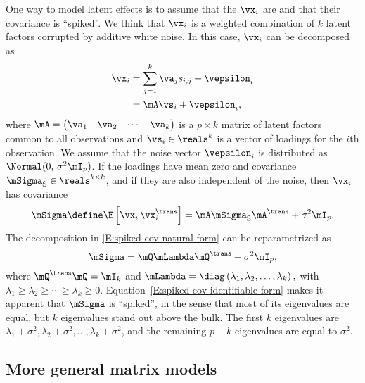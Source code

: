 One way to model latent effects is to assume that the $\vx_i$ are \iid and
that their covariance is ``spiked''. We think that $\vx_i$ is a weighted
combination of $k$ latent factors corrupted by additive white noise. In this
case, $\vx_i$ can be decomposed as
\begin{align}
    \vx_i
        &=
        \sum_{j=1}^k
            \va_j
            s_{i,j}
        +
        \vepsilon_i \notag \\
        &=
        \mA \vs_i + \vepsilon_i,
\end{align}
where
\(
    \mA
    =
    \left(
    \begin{matrix}
        \va_1 & \va_2 & \cdots & \va_k
    \end{matrix}
    \right)
\)
is a $p \times k$ matrix of latent factors common to all observations and
$\vs_i \in \reals^{k}$ is a vector of loadings for the $i$th observation. We assume that the
noise vector $\vepsilon_i$ is distributed as $\Normal( 0, \, \sigma^2 \mI_p
)$. If the loadings have mean zero and covariance $\mSigma_\text{S} \in
\reals^{k \times k}$, and if they are also independent of the noise, then
$\vx_i$ has covariance
\begin{equation}\label{E:spiked-cov-natural-form}
    \mSigma
        \define
        \E \left[ \vx_i \, \vx_i^\trans \right]
            =
                \mA \mSigma_\text{S} \mA^\trans
                +
                \sigma^2
                \mI_p.
\end{equation}
The decomposition in \eqref{E:spiked-cov-natural-form} can be reparametrized
as
\begin{equation}\label{E:spiked-cov-identifiable-form}
    \mSigma
        =
        \mQ \mLambda \mQ^\trans
        +
        \sigma^2
        \mI_p,
\end{equation}
where $\mQ^\trans \mQ = \mI_k$ and
\(
    \mLambda
        = 
        \diag \left( \lambda_1, \lambda_2, \ldots, \lambda_k \right),
\)
with $\lambda_1 \geq \lambda_2 \geq \cdots \geq \lambda_k \geq 0$.
Equation~\eqref{E:spiked-cov-identifiable-form} makes it apparent that
$\mSigma$ is ``spiked'', in the sense that most of its eigenvalues are equal,
but $k$ eigenvalues stand out above the bulk. The first $k$ eigenvalues are
$\lambda_1 + \sigma^2, \lambda_2 + \sigma^2, \ldots, \lambda_k + \sigma^2$,
and the remaining $p-k$ eigenvalues are equal to $\sigma^2$.

\subsection{More general matrix models}

